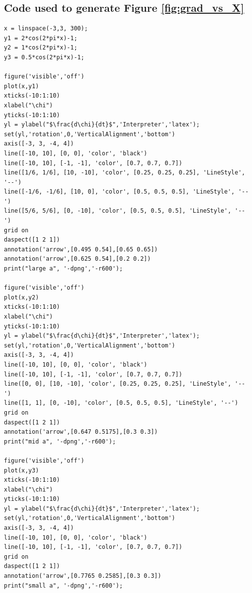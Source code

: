 \documentclass[11pt]{article} %
\begin{document}
\subsection*{Code used to generate Figure \ref{fig:grad_vs_X}}
\begin{lstlisting}
x = linspace(-3,3, 300);
y1 = 2*cos(2*pi*x)-1;
y2 = 1*cos(2*pi*x)-1;
y3 = 0.5*cos(2*pi*x)-1;

figure('visible','off')
plot(x,y1)
xticks(-10:1:10)
xlabel("\chi")
yticks(-10:1:10)
yl = ylabel("$\frac{d\chi}{dt}$",'Interpreter','latex');
set(yl,'rotation',0,'VerticalAlignment','bottom')
axis([-3, 3, -4, 4])
line([-10, 10], [0, 0], 'color', 'black')
line([-10, 10], [-1, -1], 'color', [0.7, 0.7, 0.7])
line([1/6, 1/6], [10, -10], 'color', [0.25, 0.25, 0.25], 'LineStyle', '--')
line([-1/6, -1/6], [10, 0], 'color', [0.5, 0.5, 0.5], 'LineStyle', '--')
line([5/6, 5/6], [0, -10], 'color', [0.5, 0.5, 0.5], 'LineStyle', '--')
grid on
daspect([1 2 1])
annotation('arrow',[0.495 0.54],[0.65 0.65])
annotation('arrow',[0.625 0.54],[0.2 0.2])
print("large a", '-dpng','-r600');

figure('visible','off')
plot(x,y2)
xticks(-10:1:10)
xlabel("\chi")
yticks(-10:1:10)
yl = ylabel("$\frac{d\chi}{dt}$",'Interpreter','latex');
set(yl,'rotation',0,'VerticalAlignment','bottom')
axis([-3, 3, -4, 4])
line([-10, 10], [0, 0], 'color', 'black')
line([-10, 10], [-1, -1], 'color', [0.7, 0.7, 0.7])
line([0, 0], [10, -10], 'color', [0.25, 0.25, 0.25], 'LineStyle', '--')
line([1, 1], [0, -10], 'color', [0.5, 0.5, 0.5], 'LineStyle', '--')
grid on
daspect([1 2 1])
annotation('arrow',[0.647 0.5175],[0.3 0.3])
print("mid a", '-dpng','-r600');

figure('visible','off')
plot(x,y3)
xticks(-10:1:10)
xlabel("\chi")
yticks(-10:1:10)
yl = ylabel("$\frac{d\chi}{dt}$",'Interpreter','latex');
set(yl,'rotation',0,'VerticalAlignment','bottom')
axis([-3, 3, -4, 4])
line([-10, 10], [0, 0], 'color', 'black')
line([-10, 10], [-1, -1], 'color', [0.7, 0.7, 0.7])
grid on
daspect([1 2 1])
annotation('arrow',[0.7765 0.2585],[0.3 0.3])
print("small a", '-dpng','-r600');
\end{lstlisting}
\end{document}
